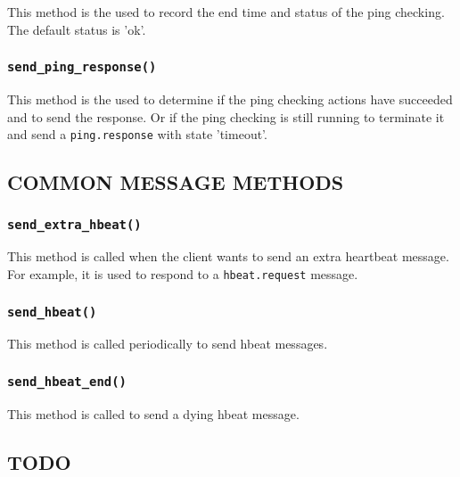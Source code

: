 \documentclass[12pt,a4paper]{article}
\begin{document}
This method is the used to record the end time and status of the ping
checking.  The default status is 'ok'.

\subsubsection*{\texttt{send\_ping\_response()}\label{xPL::Client_send_ping_response_}}


This method is the used to determine if the ping checking actions have
succeeded and to send the response.  Or if the ping checking is still
running to terminate it and send a \texttt{ping.response} with state
'timeout'.

\subsection*{COMMON MESSAGE METHODS\label{xPL::Client_COMMON_MESSAGE_METHODS}}
\subsubsection*{\texttt{send\_extra\_hbeat()}\label{xPL::Client_send_extra_hbeat_}}


This method is called when the client wants to send an extra heartbeat
message.  For example, it is used to respond to a \texttt{hbeat.request}
message.

\subsubsection*{\texttt{send\_hbeat()}\label{xPL::Client_send_hbeat_}}


This method is called periodically to send hbeat messages.

\subsubsection*{\texttt{send\_hbeat\_end()}\label{xPL::Client_send_hbeat_end_}}


This method is called to send a dying hbeat message.

\subsection*{TODO\label{xPL::Client_TODO}}
\end{document}

